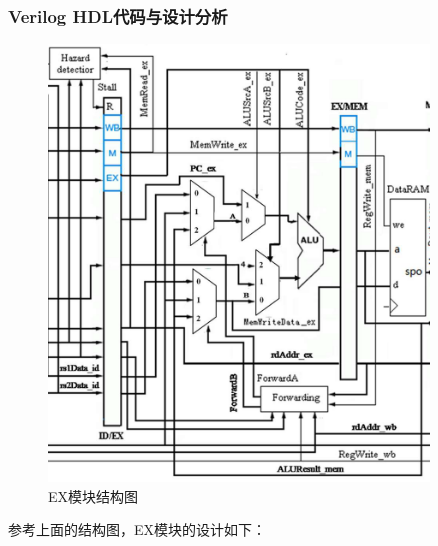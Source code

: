 \documentclass[12pt,hyperref,a4paper,UTF8]{ctexart}
\begin{document}
\subsubsection*{\Large Verilog HDL代码与设计分析}

\normalsize
    \begin{figure}[H]
        \centering
        \includegraphics[width=0.9\textwidth]{figures/fig/image13.png}
        \caption{EX模块结构图}
    \end{figure}
参考上面的结构图，EX模块的设计如下：
\end{document}
